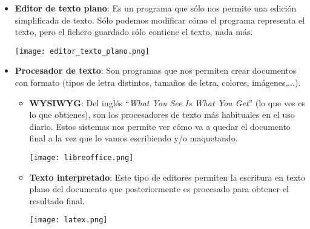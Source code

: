 \begin{itemize}
    \item \textbf{Editor de texto plano}: Es un programa que sólo nos permite una edición simplificada de texto. Sólo podemos modificar cómo el programa representa el texto, pero el fichero guardado sólo contiene el texto, nada más.

    \begin{center}
        \vspace{-10pt}
        \texttt{[image: editor\_texto\_plano.png]}
        \vspace{-10pt}
    \end{center}

    \item \textbf{Procesador de texto}: Son programas que nos permiten crear documentos con formato (tipos de letra distintos, tamaños de letra, colores, imágenes,...).
    \begin{itemize}
        \item \textbf{WYSIWYG}: Del inglés “\textit{What You See Is What You Get}” (lo que ves es lo que obtienes), son los procesadores de texto más habituales en el uso diario. Estos sistemas nos permite ver cómo va a quedar el documento final a la vez que lo vamos escribiendo y/o maquetando.

        \begin{center}
            \texttt{[image: libreoffice.png]}
            \vspace{-5pt}
            \vspace{-10pt}
        \end{center}

        \item \textbf{Texto interpretado}: Este tipo de editores permiten la escritura en texto plano del documento que posteriormente es procesado para obtener el resultado final.

        \begin{center}
            \texttt{[image: latex.png]}
            \vspace{-5pt}
            \vspace{-10pt}
        \end{center}
    \end{itemize}

\end{itemize}


